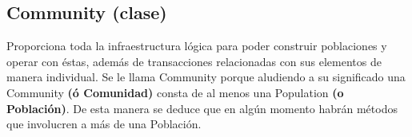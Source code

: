 \documentclass[class=report, crop=false]{standalone}
\begin{document}
\subsection{Community (clase)}
\label{sec:a_2_2}
\begin{fulllineitems}

\begin{DUlineblock}{0em}
\item[] Proporciona toda la infraestructura lógica para poder construir 
poblaciones y operar con éstas, además de transacciones relacionadas 
con sus elementos de manera individual.\break
Se le llama Community porque aludiendo a su significado una Community 
\textbf{(ó Comunidad)} consta de al menos una Population \textbf{(o Población)}. 
De esta manera se deduce que en algún momento habrán métodos que 
involucren a más de una Población.
\end{DUlineblock}


\end{fulllineitems}
\end{document}
